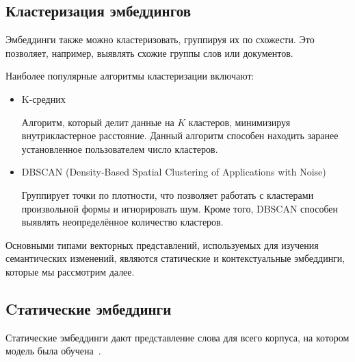 \documentclass[LI,VKR]{HSEUniversity}
\begin{document}
\subsection{Кластеризация эмбеддингов}

Эмбеддинги также можно кластеризовать, группируя их по схожести.
Это позволяет, например, выявлять схожие группы слов или документов.

Наиболее популярные алгоритмы кластеризации включают:

\begin{itemize}
    \item K-средних

Алгоритм, который делит данные на \(K\) кластеров, минимизируя внутрикластерное расстояние.
Данный алгоритм способен находить заранее установленное пользователем число кластеров.
    \item DBSCAN (Density-Based Spatial Clustering of Applications with Noise)~\cite{DBSCAN}

Группирует точки по плотности, что позволяет работать с кластерами произвольной формы и игнорировать шум.
Кроме того, DBSCAN способен выявлять неопределённое количество кластеров.
\end{itemize}

Основными типами векторных представлений, используемых для изучения семантических изменений,
являются статические и контекстуальные эмбеддинги,
которые мы рассмотрим далее.

\subsection{Cтатические эмбеддинги}


Статические эмбеддинги дают представление слова для всего корпуса,
на котором модель была обучена~\cite{TahmasebiComputationalApproachesToSemanticChange}.
\end{document}

